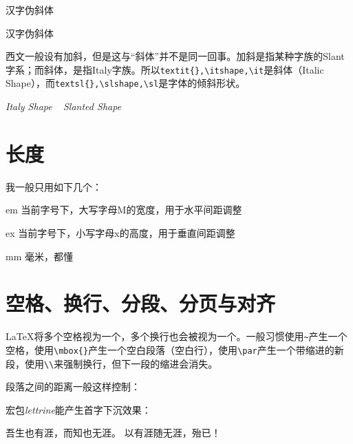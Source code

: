 \begin{center}
	{汉字伪斜体}
\end{center}

\begin{latex}
{汉字伪斜体}
\end{latex}

西文一般设有加斜，但是这与“斜体”并不是同一回事。加斜是指某种字族的Slant字系；而斜体，是指Italy字族。所以\verb|textit{},\itshape,\it|是斜体（Italic Shape），而\verb|textsl{},\slshape,\sl|是字体的倾斜形状。

\begin{center}
	{ \textit{Italy Shape} ~ \textsl{Slanted Shape}}
\end{center}

\section{长度}

我一般只用如下几个：

\begin{asparadesc}
	\item[em] 当前字号下，大写字母M的宽度，用于水平间距调整
	\item[ex] 当前字号下，小写字母x的高度，用于垂直间距调整
	\item[mm] 毫米，都懂
\end{asparadesc}



\section{空格、换行、分段、分页与对齐}

\LaTeX 将多个空格视为一个，多个换行也会被视为一个。一般习惯使用\verb|~|产生一个空格，使用\verb|\mbox{}|产生一个空白段落（空白行），使用\verb|\par|产生一个带缩进的新段，使用\verb|\\|来强制换行，但下一段的缩进会消失。

段落之间的距离一般这样控制：

\begin{latex}
\setlength{\parskip}{0pt plus 1pt}%
\end{latex}

宏包\emph{lettrine}能产生首字下沉效果：

\begin{codeshow}
	\lettrine{吾}{}生也有涯，而知也无涯。
	以有涯随无涯，殆已！
\end{codeshow}

